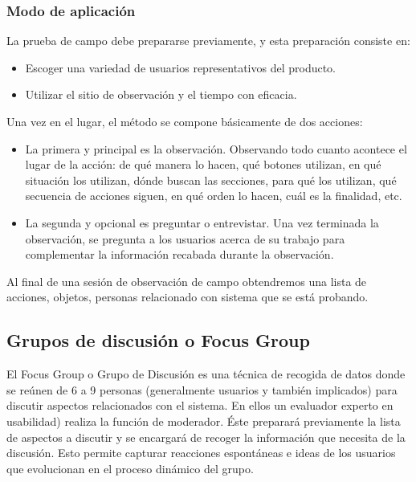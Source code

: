 \subsubsection{Modo de aplicación}
La prueba de campo debe prepararse previamente, y esta preparación consiste en:
\begin{itemize}
    \item Escoger una variedad de usuarios representativos del producto.
    \item Utilizar el sitio de observación y el tiempo con eficacia. 
\end{itemize}
Una vez en el lugar, el método se compone básicamente de dos acciones:
\begin{itemize}
    \item La primera y principal es la observación. Observando todo cuanto acontece el lugar de la acción: de qué manera lo hacen, qué botones utilizan, en qué situación los utilizan, dónde buscan las secciones, para qué los utilizan, qué secuencia de acciones siguen, en qué orden lo hacen, cuál es la finalidad, etc.
    \item La segunda y opcional es preguntar o entrevistar. Una vez terminada la observación, se pregunta a los usuarios acerca de su trabajo para complementar la información recabada durante la observación.
\end{itemize}
Al final de una sesión de observación de campo obtendremos una lista de acciones, objetos, personas relacionado con sistema que se está probando.

\subsection{Grupos de discusión o Focus Group}
El Focus Group o Grupo de Discusión es una técnica de recogida de datos donde se reúnen de 6 a 9 personas (generalmente usuarios y también implicados) para discutir aspectos relacionados con el sistema. En ellos un evaluador experto en usabilidad) realiza la función de moderador. Éste preparará previamente la lista de aspectos a discutir y se encargará de recoger la información que necesita de la discusión.
Esto permite capturar reacciones espontáneas e ideas de los usuarios que evolucionan en el proceso dinámico del grupo.
